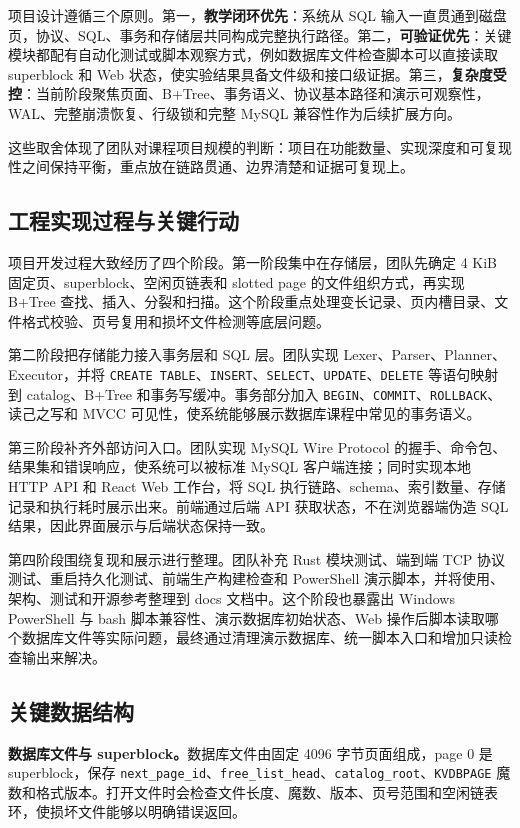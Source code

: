 \documentclass[UTF8,a4paper,12pt]{ctexart}
\newcommand{\code}[1]{\texttt{#1}}
\begin{document}
项目设计遵循三个原则。第一，\textbf{教学闭环优先}：系统从 SQL 输入一直贯通到磁盘页，协议、SQL、事务和存储层共同构成完整执行路径。第二，\textbf{可验证优先}：关键模块都配有自动化测试或脚本观察方式，例如数据库文件检查脚本可以直接读取 superblock 和 Web 状态，使实验结果具备文件级和接口级证据。第三，\textbf{复杂度受控}：当前阶段聚焦页面、B+Tree、事务语义、协议基本路径和演示可观察性，WAL、完整崩溃恢复、行级锁和完整 MySQL 兼容性作为后续扩展方向。

这些取舍体现了团队对课程项目规模的判断：项目在功能数量、实现深度和可复现性之间保持平衡，重点放在链路贯通、边界清楚和证据可复现上。

\subsection{工程实现过程与关键行动}

项目开发过程大致经历了四个阶段。第一阶段集中在存储层，团队先确定 4 KiB 固定页、superblock、空闲页链表和 slotted page 的文件组织方式，再实现 B+Tree 查找、插入、分裂和扫描。这个阶段重点处理变长记录、页内槽目录、文件格式校验、页号复用和损坏文件检测等底层问题。

第二阶段把存储能力接入事务层和 SQL 层。团队实现 Lexer、Parser、Planner、Executor，并将 \code{CREATE TABLE}、\code{INSERT}、\code{SELECT}、\code{UPDATE}、\code{DELETE} 等语句映射到 catalog、B+Tree 和事务写缓冲。事务部分加入 \code{BEGIN}、\code{COMMIT}、\code{ROLLBACK}、读己之写和 MVCC 可见性，使系统能够展示数据库课程中常见的事务语义。

第三阶段补齐外部访问入口。团队实现 MySQL Wire Protocol 的握手、命令包、结果集和错误响应，使系统可以被标准 MySQL 客户端连接；同时实现本地 HTTP API 和 React Web 工作台，将 SQL 执行链路、schema、索引数量、存储记录和执行耗时展示出来。前端通过后端 API 获取状态，不在浏览器端伪造 SQL 结果，因此界面展示与后端状态保持一致。

第四阶段围绕复现和展示进行整理。团队补充 Rust 模块测试、端到端 TCP 协议测试、重启持久化测试、前端生产构建检查和 PowerShell 演示脚本，并将使用、架构、测试和开源参考整理到 docs 文档中。这个阶段也暴露出 Windows PowerShell 与 bash 脚本兼容性、演示数据库初始状态、Web 操作后脚本读取哪个数据库文件等实际问题，最终通过清理演示数据库、统一脚本入口和增加只读检查输出来解决。

\subsection{关键数据结构}

\textbf{数据库文件与 superblock。}数据库文件由固定 4096 字节页面组成，page 0 是 superblock，保存 \code{next\_page\_id}、\code{free\_list\_head}、\code{catalog\_root}、\code{KVDBPAGE} 魔数和格式版本。打开文件时会检查文件长度、魔数、版本、页号范围和空闲链表环，使损坏文件能够以明确错误返回。
\end{document}
